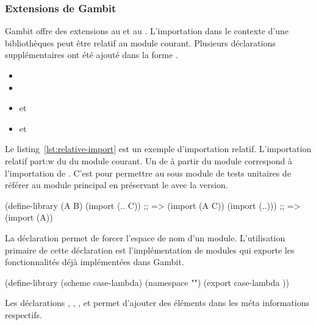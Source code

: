 \subsubsection{Extensions de Gambit}

Gambit offre des extensions au  et au .
L'importation dans le contexte d'une bibliothèques peut être relatif au module
courant. Plusieurs déclarations supplémentaires ont été ajouté dans la forme
.

\begin{itemize}
  \item {}
  \item {}
  \item {} et 
  \item {} et 
\end{itemize}


Le listing~\ref{lst:relative-import} est un exemple d'importation
relatif.  L'importation relatif part:w
du  du module courant.
Un  de  à partir du module 
correspond à l'importation de . C'est pour permettre au sous
module de tests unitaires de référer au module principal en préservant le
 avec la version. \\

\begin{center}
  \begin{mplisting}{0.8}
(define-library (A B)
  (import (.. C))  ;; => (import (A C))
  (import (..))) ;; => (import (A))
\end{mplisting}
\end{center}

La déclaration  permet de forcer l'espace de nom d'un module.
L'utilisation primaire de cette déclaration est l'implémentation de modules qui
exporte les fonctionnalités déjà implémentées dans Gambit. \\

\begin{center}
  \begin{mplisting}{0.8}
(define-library (scheme case-lambda)
  (namespace "")
  (export
case-lambda
))
\end{mplisting}
\end{center}

Les déclarations , , ,
 et  permet d'ajouter des éléments dans les
méta informations respectifs.
